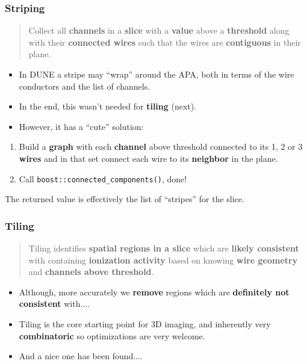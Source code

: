 \documentclass[xcolor=dvipsnames]{beamer}
\begin{document}
\begin{frame}
  \frametitle{Striping}

  \begin{quote}
    Collect all  \textbf{channels} in a \textbf{slice} with a \textbf{value} above a \textbf{threshold} along with their \textbf{connected wires} such that the wires are \textbf{contiguous} in their plane.
  \end{quote}

  \begin{itemize}
  \item In DUNE a stripe may ``wrap'' around the APA, both in terms of the wire conductors and the list of channels.
  \item In the end, this wasn't needed for \textbf{tiling} (next).
  \item However, it has a ``cute'' solution:
  \end{itemize}
  \begin{enumerate}\footnotesize
  \item Build a \textbf{graph} with each \textbf{channel} above threshold connected to its 1, 2 or 3 \textbf{wires} and in that set connect each wire to its \textbf{neighbor} in the plane.
  \item Call \texttt{boost::connected\_components()}, done!
  \end{enumerate}
  The returned value is effectively the list of ``stripes'' for the slice.
\end{frame}

\begin{frame}
  \frametitle{Tiling}

  \begin{quote}
    Tiling identifies \textbf{spatial regions in a slice} which are \textbf{likely consistent} with containing \textbf{ionization activity} based on knowing \textbf{wire geometry} and \textbf{channels above threshold}.
  \end{quote}
  \begin{itemize}\footnotesize
  \item   Although, more accurately we \textbf{remove} regions which are \textbf{definitely not consistent} with....

  \item Tiling is the core starting point for 3D imaging, and inherently very \textbf{combinatoric} so optimizations are very welcome.

  \item And a nice one has been found....

  \end{itemize}
\end{frame}
\end{document}
